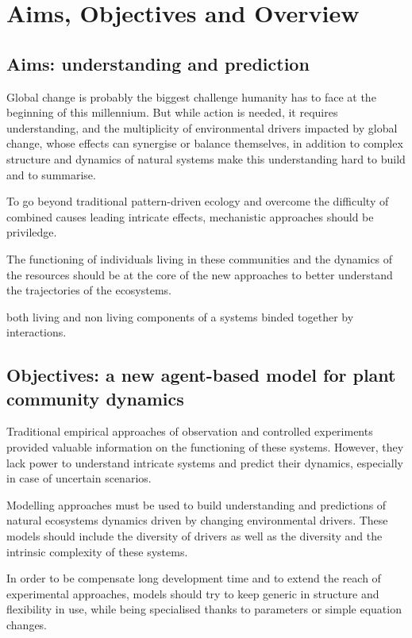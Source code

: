 \chapter{Aims, Objectives and Overview}


\section{Aims: understanding and prediction}

Global change is probably the biggest challenge humanity has to face at the beginning of this millennium. But while action is needed, it requires understanding, and the multiplicity of environmental drivers impacted by global change, whose effects can synergise or balance themselves, in addition to complex structure and dynamics of natural systems make this understanding hard to build and to summarise.

To go beyond traditional pattern-driven ecology and overcome the difficulty of combined causes leading intricate effects, mechanistic approaches should be priviledge. 

The functioning of individuals living in these communities and the dynamics of the resources should be at the core of the new approaches to better understand the trajectories of the ecosystems.

 both living and non living components of a systems binded together by interactions. 
%

\section{Objectives: a new agent-based model for plant community dynamics} %
Traditional empirical approaches of observation and controlled experiments provided valuable information on the functioning of these systems. However, they lack power to understand intricate systems and predict their dynamics, especially in case of uncertain scenarios. 

Modelling approaches must be used to build understanding and predictions of natural ecosystems dynamics driven by changing environmental drivers. These models should include the diversity of drivers as well as the diversity and the intrinsic complexity of these systems.

In order to be compensate long development time and to extend the reach of experimental approaches, models should try to keep generic in structure and flexibility in use, while being specialised thanks to parameters or simple equation changes.

